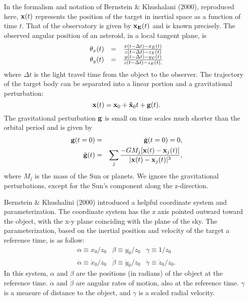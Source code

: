 \documentclass[11pt,letter]{article}
\begin{document}
\begin{enumerate}
    In the formalism and notation of Bernstein \& Khushalani (2000), reproduced here,  ${\bf x}(t)$ represents the position of the target in inertial space as a function of time $t$.  That of the observatory is given by ${\bf x_E}(t)$ and is known precisely.  The observed angular position of an asteroid, in a local tangent plane, is 
\begin{equation}
\begin{array}{ccc}
\theta_x(t) & = & { {x(t-\Delta t) - x_E(t)} \over {z(t-\Delta t) -
z_E(t)}} \\
\theta_y(t) & = & { {y(t-\Delta t) - y_E(t)} \over {z(t-\Delta t) -
z_E(t)}, }
\end{array}
\label{exact}
\end{equation}
where $\Delta t$ is the light travel time from the object to the observer.
The trajectory of the target body can be separated into a linear portion and a gravitational perturbation:
\begin{equation}
\label{orbit1}
{\bf x}(t) = {\bf x}_0 + {\bf \dot x}_0 t + {\bf g}(t).
\end{equation}
The gravitational perturbation ${\bf g}$  is small on time scales much shorter than the orbital period and is given by
\begin{eqnarray}
{\bf g}(t=0) & = & \dot {\bf g}(t=0)  =  0, \\
\ddot {\bf g}(t) & = & \sum_j { -{GM_j[{\bf x}(t)-{\bf x}_j(t)]}
	\over {|{\bf x}(t)-{\bf x}_j(t)|^3 } },
\label{nbody}
\end{eqnarray}
where $M_j$ is the mass of the Sun or planets.   We ignore the gravitational perturbations, except for the Sun's component along the z-direction.

Bernstein \& Khushalini (2000) introduced a helpful coordinate system and parameterization. The coordinate system has the z axis pointed outward toward the object, with the x-y plane coinciding with the plane of the sky.  The parameterization, based on the inertial position and velocity of the target a reference time, is as follow:
\begin{equation}
\label{definitions}
\begin{array}{lll}
\alpha \equiv {x_0}/{z_0} & \beta \equiv {y_0}/{z_0} & 
	\gamma \equiv 1/{z_0} \\ 
\dot\alpha \equiv {\dot x_0}/{z_0} & \dot\beta \equiv {\dot y_0}/{z_0} & 
	\dot\gamma \equiv {\dot z_0}/{z_0} .
\end{array}
\end{equation}
In this system, $\alpha$ and $\beta$ are the positions (in radians) of the object at the reference time.  $\dot \alpha$ and $\dot \beta$ are angular rates of motion, also at the reference time.  $\gamma$ is a measure of distance to the object, and $\dot \gamma$ is a scaled radial velocity.


\end{enumerate}
\end{document}

